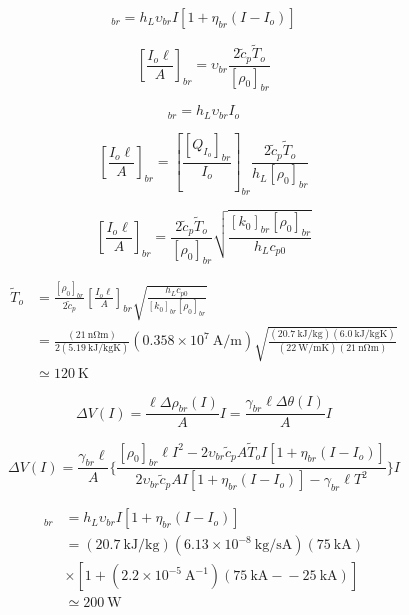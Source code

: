 \begin{equation}%
[Q_{I_o}]_{br}=h_L\upsilon_{br}I[1+\eta_{br}(I-I_o)]
\end{equation}

\begin{equation}
\left[\frac{I_o\ell}{A}\right]_{br}=\upsilon_{br}\frac{2\tilde{c}_p\tilde{T}_o}{[\rho_0]_{br}}
\end{equation}

\begin{equation}
[Q_{I_o}]_{br}=h_L\upsilon_{br}I_o
\end{equation}

\begin{equation}
\left[\frac{I_o\ell}{A}\right]_{br}=\left[\frac{[Q_{I_o}]_{br}}{I_o}\right]_{br}\frac{2\tilde{c}_p\tilde{T}_o}{h_L[\rho_0]_{br}}
\end{equation}

\begin{equation}%
\left[\frac{I_o\ell}{A}\right]_{br}=\frac{2\tilde{c}_p\tilde{T}_o}{[\rho_0]_{br}}\sqrt{\frac{[k_0]_{br}[\rho_0]_{br}}{h_Lc_{p0}}}
\end{equation}

\begin{align*}
\tilde{T}_o&=\frac{[\rho_0]_{br}}{2\tilde{c}_p}\left[\frac{I_o\ell}{A}\right]_{br}\sqrt{\frac{h_Lc_{p0}}{[k_0]_{br}[\rho_0]_{br}}} \\
&=\frac{(21\ \mathrm{n\Omega m})}{2(5.19\ \mathrm{kJ/kgK})}(0.358\times 10^7\ \mathrm{A/m})\sqrt{\frac{(20.7\ \mathrm{kJ/kg})(6.0\ \mathrm{kJ/kgK})}{(22\ \mathrm{W/mK})(21\ \mathrm{n\Omega m})}}\\
&\simeq 120\ \mathrm{K}
\end{align*}

\begin{equation}
\Delta V(I)=\frac{\ell\Delta\rho_{br}(I)}{A}I=\frac{\gamma_{br}\ell\Delta\theta(I)}{A}I
\end{equation}

\begin{equation}%
\Delta V(I)=\frac{\gamma_{br}\ell}{A}\{\frac{[\rho_0]_{br}\ell I^2-2\upsilon_{br}\tilde{c}_pA\tilde{T}_oI[1+\eta_{br}(I-I_o)]}{2\upsilon_{br}\tilde{c}_pAI[1+\eta_{br}(I-I_o)]-\gamma_{br}\ell T^2}\}I
\end{equation}

\begin{align*}%
[Q_{I_o}]_{br}&=h_L\upsilon_{br}I[1+\eta_{br}(I-I_o)] \\
&=(20.7\ \mathrm{kJ/kg})(6.13\times 10^{-8}\ \mathrm{kg/sA})(75\ \mathrm{kA}) \\
&\times[1+(2.2\times 10^{-5}\ \mathrm{A^{-1}})(75\ \mathrm{kA-}-25\ \mathrm{kA})]\\
&\simeq 200\ \mathrm{W}
\end{align*}

